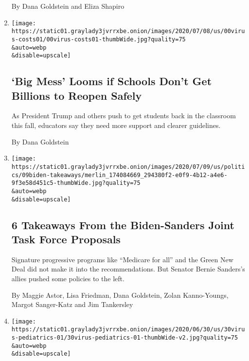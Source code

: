 \begin{enumerate}
  By Dana Goldstein and Eliza Shapiro
\item
  \href{/2020/07/09/us/schools-reopening-trump.html}{}

  \texttt{[image: https://static01.graylady3jvrrxbe.onion/images/2020/07/08/us/00virus-costs01/00virus-costs01-thumbWide.jpg?quality=75\\\&auto=webp\\\&disable=upscale]}

  \hypertarget{big-mess-looms-if-schools-dont-get-billions-to-reopen-safely}{%
  \subsection{`Big Mess' Looms if Schools Don't Get Billions to Reopen
  Safely}\label{big-mess-looms-if-schools-dont-get-billions-to-reopen-safely}}

  As President Trump and others push to get students back in the
  classroom this fall, educators say they need more support and clearer
  guidelines.

  By Dana Goldstein
\item
  \href{/2020/07/09/us/politics/biden-sanders-task-force.html}{}

  \texttt{[image: https://static01.graylady3jvrrxbe.onion/images/2020/07/09/us/politics/09biden-takeaways/merlin\_174084669\_294380f2-e0f9-4b12-a4e6-9f3e58d451c5-thumbWide.jpg?quality=75\\\&auto=webp\\\&disable=upscale]}

  \hypertarget{6-takeaways-from-the-biden-sanders-joint-task-force-proposals}{%
  \subsection{6 Takeaways From the Biden-Sanders Joint Task Force
  Proposals}\label{6-takeaways-from-the-biden-sanders-joint-task-force-proposals}}

  Signature progressive programs like ``Medicare for all'' and the Green
  New Deal did not make it into the recommendations. But Senator Bernie
  Sanders's allies pushed some policies to the left.

  By Maggie Astor, Lisa Friedman, Dana Goldstein, Zolan Kanno-Youngs,
  Margot Sanger-Katz and Jim Tankersley
\item
  \href{/2020/06/30/us/coronavirus-schools-reopening-guidelines-aap.html}{}

  \texttt{[image: https://static01.graylady3jvrrxbe.onion/images/2020/06/30/us/30virus-pediatrics-01/30virus-pediatrics-01-thumbWide-v2.jpg?quality=75\\\&auto=webp\\\&disable=upscale]}


\end{enumerate}
